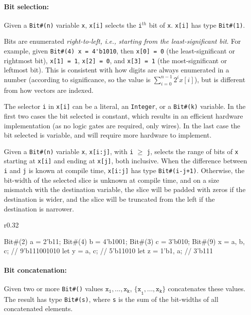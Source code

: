 \paragraph{Bit selection:}
Given a \verb|Bit#(n)| variable \verb|x|,
\verb|x[i]| selects the \verb|i|$^{th}$ bit of \verb|x|.
\verb|x[i]| has type \verb|Bit#(1)|.

Bits are enumerated \emph{right-to-left, i.e., starting from the least-significant bit}.
For example, given \verb|Bit#(4) x = 4'b1010|,
then \verb|x[0] = 0| (the least-significant or rightmost bit), 
\verb|x[1] = 1|, \verb|x[2] = 0|,
and \verb|x[3] = 1| (the most-significant or leftmost bit).
This is consistent with how digits are always enumerated in a number (according to significance, so the value is $\sum_{i=0}^{n-1}2^ix[i]$),
but is different from how vectors are indexed.

The selector \verb|i| in \verb|x[i]| can be a literal, an \verb|Integer|, or a \verb|Bit#(k)| variable. In the first two cases the bit selected is constant,
which results in an efficient hardware implementation (as no logic gates are required, only wires).
In the last case the bit selected is variable, and will require more hardware to implement.

Given a \verb|Bit#(n)| variable \verb|x|,
\verb|x[i:j]|, with \verb|i| $\geq$ \verb|j|, selects the range of bits of \verb|x|
starting at \verb|x[i]| and ending at \verb|x[j]|, both inclusive.
When the difference between \verb|i| and \verb|j| is known at compile time,
\verb|x[i:j]| has type \verb|Bit#(i-j+1)|.
Otherwise, the bit-width of the selected slice is unknown at compile time,
and on a size mismatch with the destination variable,
the slice will be padded with zeros if the destination is wider,
and the slice will be truncated from the left if the destination is narrower.


\begin{wrapfigure}{r}{0.32\columnwidth}
\vspace{-2em}
\begin{mscode}
Bit#(2) a = 2'b11;
Bit#(4) b = 4'b1001;
Bit#(3) c = 3'b010;
Bit#(9) x = 
  {a, b, c};  // 9'b111001010
let y = {a, c};   // 5'b11010
let z = {1'b1, a};  // 3'b111
\end{mscode}
\vspace{-2.5em}
\end{wrapfigure}

\paragraph{Bit concatenation:}
Given two or more \verb|Bit#()| values $\texttt{x}_\texttt{1},...,\texttt{x}_\texttt{k}$,
$\texttt{\{x}_\texttt{1},...,\texttt{x}_\texttt{k}\texttt{\}}$ concatenates these values. The result has type \verb|Bit#(s)|, where \verb|s| is the sum of the bit-widths of all concatenated elements.

